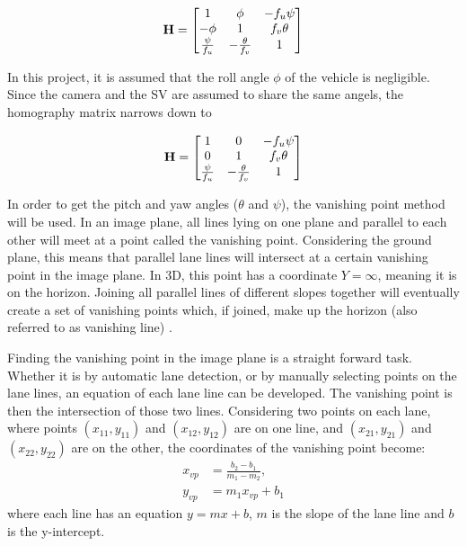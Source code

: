 \begin{equation}
\bf{H} = 
\begin{bmatrix}
1 & \phi & -f_u \psi \\
-\phi & 1 & f_v \theta \\
\frac{\psi}{f_u} & -\frac{\theta}{f_v} & 1
\end{bmatrix}     
\end{equation}

In this project, it is assumed that the roll angle $\phi$ of the vehicle is negligible. Since the camera and the SV are assumed to share the same angels, the homography matrix narrows down to

\begin{equation}
\bf{H} = 
\begin{bmatrix}
1 & 0 & -f_u \psi \\
0 & 1 & f_v \theta \\
\frac{\psi}{f_u} & -\frac{\theta}{f_v} & 1
\end{bmatrix}   
\end{equation}

In order to get the pitch and yaw angles ($\theta$ and $\psi$), the vanishing point method will be used. In an image plane, all lines lying on one plane and parallel to each other will meet at a point called the vanishing point. Considering the ground plane, this means that parallel lane lines will intersect at a certain vanishing point in the image plane. In 3D, this point has a coordinate $Y=\infty$, meaning it is on the horizon. Joining all parallel lines of different slopes together will eventually create a set of vanishing points which, if joined, make up the horizon (also referred to as vanishing line) \cite{WANG2004}.

Finding the vanishing point in the image plane is a straight forward task. Whether it is by automatic lane detection, or by manually selecting points on the lane lines, an equation of each lane line can be developed. The vanishing point is then the intersection of those two lines. Considering two points on each lane, where points $(x_{11},y_{11})$ and $(x_{12},y_{12})$ are on one line, and $(x_{21},y_{21})$ and $(x_{22},y_{22})$ are on the other, the coordinates of the vanishing point become:
\begin{align}
    x_{vp} &= \frac{b_2-b_1}{m_1-m_2},\\
    y_{vp} &= m_1 x_{vp} + b_1
\end{align}
where each line has an equation $y = mx + b$, $m$ is the slope of the lane line and $b$ is the y-intercept.

